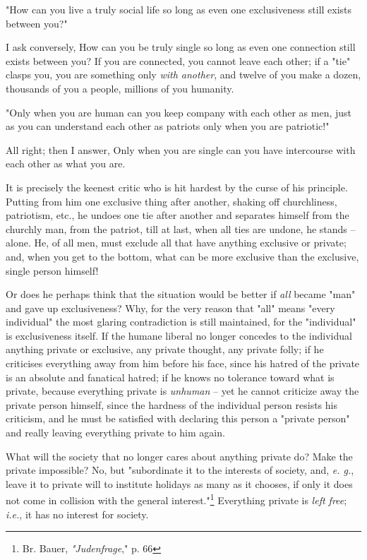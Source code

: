 "{}How can you live a truly social life so long as even one exclusiveness 
still exists between you?"{}

I ask conversely, How can you be truly single so long as even one connection 
still exists between you? If you are connected, you cannot leave each other; 
if a "{}tie"{} clasps you, you are something only \textit{with another}, and 
twelve of you make a dozen, thousands of you a people, millions of you 
humanity.

"{}Only when you are human can you keep company with each other as men, just 
as you can understand each other as patriots only when you are patriotic!"{}

All right; then I answer, Only when you are single can you have intercourse 
with each other as what you are.

It is precisely the keenest critic who is hit hardest by the curse of his 
principle. Putting from him one exclusive thing after another, shaking off 
churchliness, patriotism, etc., he undoes one tie after another and separates 
himself from the churchly man, from the patriot, till at last, when all ties 
are undone, he stands -- alone. He, of all men, must exclude all that have 
anything exclusive or private; and, when you get to the bottom, what can be 
more exclusive than the exclusive, single person himself!

Or does he perhaps think that the situation would be better if \textit{all} 
became "{}man"{} and gave up exclusiveness? Why, for the very reason that 
"{}all"{} means "{}every individual"{} the most glaring contradiction is still 
maintained, for the "{}individual"{} is exclusiveness itself. If the humane 
liberal no longer concedes to the individual anything private or exclusive, 
any private thought, any private folly; if he criticises everything away from 
him before his face, since his hatred of the private is an absolute and 
fanatical hatred; if he knows no tolerance toward what is private, because 
everything private is \textit{unhuman} -- yet he cannot criticize away the 
private person himself, since the hardness of the individual person resists 
his criticism, and he must be satisfied with declaring this person a 
"{}private person"{} and really leaving everything private to him again.

What will the society that no longer cares about anything private do? Make the 
private impossible? No, but "{}subordinate it to the interests of society, 
and, \textit{e. g.}, leave it to private will to institute holidays as many as 
it chooses, if only it does not come in collision with the general 
interest."{}\footnote{Br. Bauer, \textit{"{}Judenfrage},"{} p. 66} Everything 
private is \textit{left free}; \textit{i.e.}, it has no interest for society.

